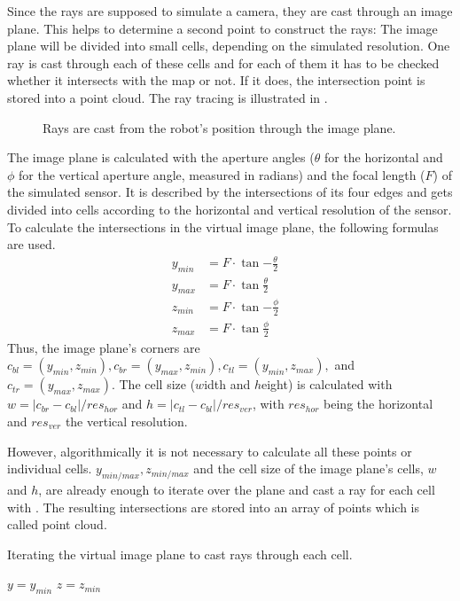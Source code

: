 \documentclass[Thesis.tex]{subfiles}
\begin{document}
Since the rays are supposed to simulate a camera, they are cast through an image plane. This helps to determine a second point to construct the rays: The image plane will be divided into small cells, depending on the simulated resolution. One ray is cast through each of these cells and for each of them it has to be checked whether it intersects with the map or not. If it does, the intersection point is stored into a point cloud. The ray tracing is illustrated in .
%
\begin{figure}[!htp]
  \caption[Ray tracing]{Rays are cast from the robot's position through the image plane.}
  \label{fig:raytrace_scheme}
\end{figure}
%
The image plane is calculated with the aperture angles ($\theta$ for the horizontal and $\phi$ for the vertical aperture angle, measured in radians) and the focal length ($F$) of the simulated sensor. It is described by the intersections of its four edges and gets divided into cells according to the horizontal and vertical resolution of the sensor. To calculate the intersections in the virtual image plane, the following formulas are used.
%
\begin{align}
y_{min} &= F \cdot \tan{-\frac{\theta}{2}} &\label{form:image_plane} \\
y_{max} &= F \cdot \tan{ \frac{\theta}{2}} &\\
z_{min} &= F \cdot \tan{-\frac{\phi}{2}} &\\
z_{max} &= F \cdot \tan{ \frac{\phi}{2}} &
\end{align}
%
Thus, the image plane's corners are $c_{bl}=(y_{min}, z_{min}), c_{br}=(y_{max}, z_{min}), c_{tl}=(y_{min}, z_{max}),$ and $c_{tr}=(y_{max}, z_{max})$. The cell size ($w$idth and $h$eight) is calculated with $w=|c_{br}-c_{bl}|/res_{hor}$ and $h=|c_{tl}-c_{bl}|/res_{ver}$, with $res_{hor}$ being the horizontal and $res_{ver}$ the vertical resolution.

However, algorithmically it is not necessary to calculate all these points or individual cells. $y_{min/max}, z_{min/max}$ and the cell size of the image plane's cells, $w$ and $h$, are already enough to iterate over the plane and cast a ray for each cell with . The resulting intersections are stored into an array of points which is called point cloud.
%
\begin{algorithm}[!htp]
\caption[Ray tracing]{Iterating the virtual image plane to cast rays through each cell.}
\label{alg:iterate_imageplane}
$y = y_{min}$\;
$z = z_{min}$\;
\end{algorithm}
\end{document}
